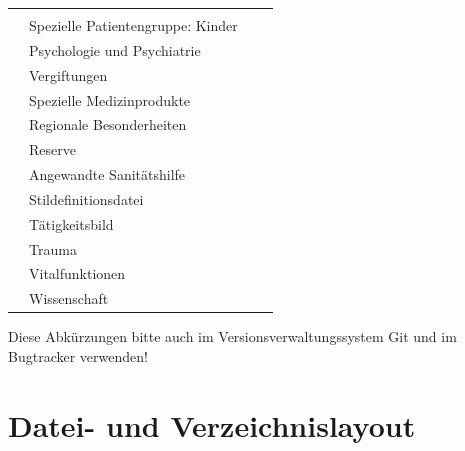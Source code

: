 \documentclass[ngerman,paper=a4,fontsize=8pt,headings=small,draft=no,parskip=half,noonelinecaption]{scrreprt}
\begin{document}
\begin{tabulary}{\linewidth}{cLlL}
 & 
\\\addlinespace
{} & Spezielle Patientengruppe: Kinder & 
 & 
\\\addlinespace
{} & Psychologie und Psychiatrie & 
 & 
\\\addlinespace
{} & Vergiftungen & 
 & 
\\\addlinespace
{} & Spezielle Medizinprodukte & 
\caps{---} & 
\\\addlinespace
{} & Regionale Besonderheiten &  \caps{---} &
\\\addlinespace
{} & Reserve &  \caps{---} &
\\\addlinespace
{} & Angewandte Sanitätshilfe &   &
\\\addlinespace
{}  & Stildefinitionsdatei &  \caps{---} &
\\\addlinespace
{} & Tätigkeitsbild &  \caps{---} &
\\\addlinespace
{} & Trauma &   &
\\\addlinespace
{} & Vitalfunktionen &   &
\\\addlinespace
{} & Wissenschaft & 
\caps{---} & 
\\\bottomrule
\end{tabulary}

Diese Abkürzungen bitte auch im Versionsverwaltungssystem
Git und im Bugtracker verwenden!

\section{Datei- und Verzeichnislayout}
\end{document}
